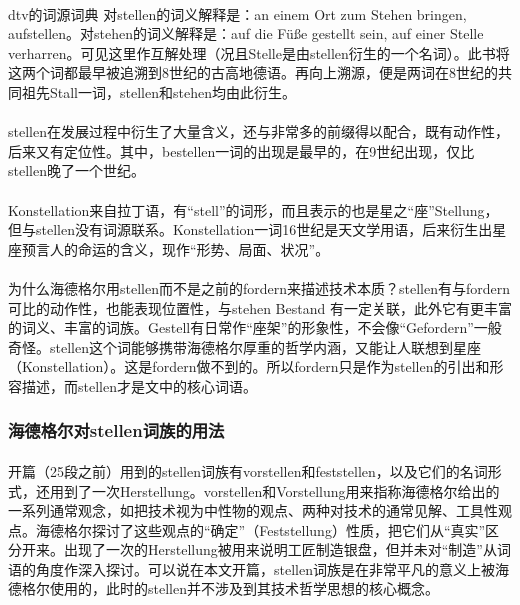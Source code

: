 \documentclass{article}
\begin{document}
			\paragraph{}
		dtv的词源词典
		\cite{yellow_etym}对stellen的词义解释是：an einem Ort zum Stehen bringen, aufstellen。对stehen的词义解释是：auf die Füße gestellt sein, auf einer Stelle verharren。可见这里作互解处理（况且Stelle是由stellen衍生的一个名词）。此书将这两个词都最早被追溯到8世纪的古高地德语。再向上溯源，便是两词在8世纪的共同祖先Stall一词，stellen和stehen均由此衍生。
			\paragraph{}
		stellen在发展过程中衍生了大量含义，还与非常多的前缀得以配合，既有动作性，后来又有定位性。其中，bestellen一词的出现是最早的，在9世纪出现，仅比stellen晚了一个世纪。
			\paragraph{}
		Konstellation来自拉丁语，有“stell”的词形，而且表示的也是星之“座”Stellung，但与stellen没有词源联系。Konstellation一词16世纪是天文学用语，后来衍生出星座预言人的命运的含义，现作“形势、局面、状况”。
			\paragraph{}
		为什么海德格尔用stellen而不是之前的fordern来描述技术本质？stellen有与fordern可比的动作性，也能表现位置性，与stehen Bestand 有一定关联，此外它有更丰富的词义、丰富的词族。Gestell有日常作“座架”的形象性，不会像“Gefordern”一般奇怪。stellen这个词能够携带海德格尔厚重的哲学内涵，又能让人联想到星座（Konstellation）。这是fordern做不到的。所以fordern只是作为stellen的引出和形容描述，而stellen才是文中的核心词语。
		\subsubsection{海德格尔对stellen词族的用法}
			\paragraph{}
		开篇（25段之前）用到的stellen词族有vorstellen和feststellen，以及它们的名词形式，还用到了一次Herstellung。vorstellen和Vorstellung用来指称海德格尔给出的一系列通常观念，如把技术视为中性物的观点、两种对技术的通常见解、工具性观点。海德格尔探讨了这些观点的“确定”（Feststellung）性质，把它们从“真实”区分开来。出现了一次的Herstellung被用来说明工匠制造银盘，但并未对“制造”从词语的角度作深入探讨。可以说在本文开篇，stellen词族是在非常平凡的意义上被海德格尔使用的，此时的stellen并不涉及到其技术哲学思想的核心概念。
\end{document}
